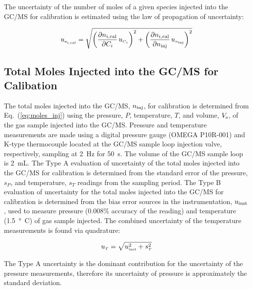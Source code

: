 \documentclass[12pt]{article}
\begin{document}
The uncertainty of the number of moles of a given species injected into the GC/MS for calibration is estimated using the law of propagation of uncertainty:

\begin{equation}
\label{eq:Given_Moles_Cal_Uncertainty}
 u_{\rm \scriptscriptstyle n_{i,\rm cal}} = \sqrt{{\left( \frac{\partial n_{i,\rm cal}}{\partial C_{i}}\,u_{\scriptscriptstyle C_{i}} \right)}^2+{\left(\frac{\partial n_{i,\rm cal}}{\partial n_{\rm inj}}\,u_{\scriptscriptstyle n_{\rm inj}}\right)}^2}
\end{equation}

\subsection{Total Moles Injected into the GC/MS for Calibation}
\label{ssec:Total Moles Injected into the GC/MS for Calibation}

The total moles injected into the GC/MS, $ n_{\rm inj}$, for calibration is determined from Eq.~(\ref{eq:moles_inj}) using the pressure, $P$, temperature, $T$, and volume, $V_{\rm s}$, of the gas sample injected into the GC/MS. Pressure and temperature measurements are made using a digital pressure gauge (OMEGA P10R-001) and K-type thermocouple located at the GC/MS sample loop injection valve, respectively, sampling at \SI{2}{Hz} for \SI{50}{s}. The volume of the GC/MS sample loop is 2~mL. The Type A evaluation of uncertainty of the total moles injected into the GC/MS for calibration is determined from the standard error of the pressure, $s_{P}$, and temperature, $s_{T}$ readings from the sampling period. The Type B evaluation of uncertainty for the total moles injected into the GC/MS for calibration is determined from the bias error sources in the instrumentation, $u_{\rm inst}$, used to measure pressure (0.008\% accuracy of the reading) and temperature (\SI{1.5}{\degree C}) of gas sample injected. The combined uncertainty of the temperature measurements is found via quadrature:

\begin{equation}
\label{eq:temp_uncertainty}
u_{\scriptscriptstyle T} = \sqrt{ u_{\rm \scriptscriptstyle inst}^2 + s_{\scriptscriptstyle T}^2}
\end{equation}

The Type A uncertainty is the dominant contribution for the uncertainty of the pressure measurements, therefore its uncertainty of pressure is approximately the standard deviation.
\end{document}

